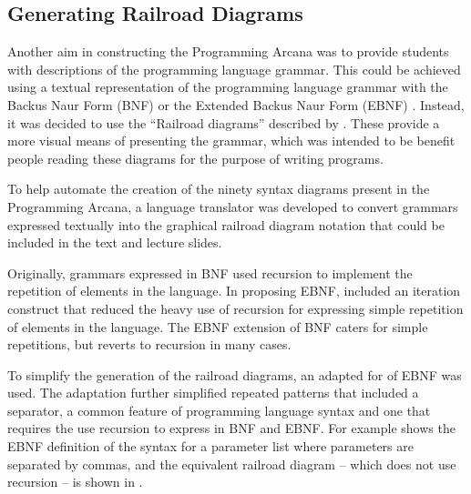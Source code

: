 
\clearpage





\subsection{Generating Railroad Diagrams} %
\label{ssub:railroad_diagrams}

Another aim in constructing the Programming Arcana was to provide students with descriptions of the programming language grammar. This could be achieved using a textual representation of the programming language grammar with the Backus Naur Form (BNF) \cite{Backus:1959} or the Extended Backus Naur Form (EBNF) \cite{Wirth:1977}. Instead, it was decided to use the ``Railroad diagrams'' described by \citet{Braz:1990}. These provide a more visual means of presenting the grammar, which was intended to be benefit people reading these diagrams for the purpose of writing programs.

To help automate the creation of the ninety syntax diagrams present in the Programming Arcana, a language translator was developed to convert grammars expressed textually into the graphical railroad diagram notation that could be included in the text and lecture slides. 

Originally, grammars expressed in BNF used recursion to implement the repetition of elements in the language. In proposing EBNF, \cite{Wirth:1977} included an iteration construct that reduced the heavy use of recursion for expressing simple repetition of elements in the language. The EBNF extension of BNF caters for simple repetitions, but reverts to recursion in many cases.

To simplify the generation of the railroad diagrams, an adapted for of EBNF was used. The adaptation further simplified repeated patterns that included a separator, a common feature of programming language syntax and one that requires the use recursion to express in BNF and EBNF. For example  shows the EBNF definition of the syntax for a parameter list where parameters are separated by commas, and the equivalent railroad diagram -- which does not use recursion -- is shown in . 

